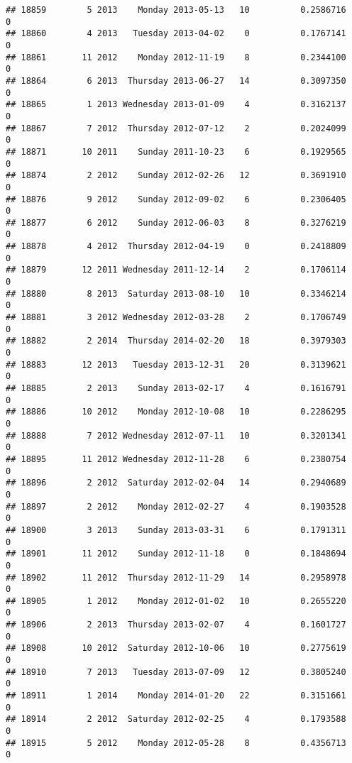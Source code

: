 \documentclass[
]{article}
\begin{document}
\begin{verbatim}
## 18859        5 2013    Monday 2013-05-13   10          0.2586716             0
## 18860        4 2013   Tuesday 2013-04-02    0          0.1767141             0
## 18861       11 2012    Monday 2012-11-19    8          0.2344100             0
## 18864        6 2013  Thursday 2013-06-27   14          0.3097350             0
## 18865        1 2013 Wednesday 2013-01-09    4          0.3162137             0
## 18867        7 2012  Thursday 2012-07-12    2          0.2024099             0
## 18871       10 2011    Sunday 2011-10-23    6          0.1929565             0
## 18874        2 2012    Sunday 2012-02-26   12          0.3691910             0
## 18876        9 2012    Sunday 2012-09-02    6          0.2306405             0
## 18877        6 2012    Sunday 2012-06-03    8          0.3276219             0
## 18878        4 2012  Thursday 2012-04-19    0          0.2418809             0
## 18879       12 2011 Wednesday 2011-12-14    2          0.1706114             0
## 18880        8 2013  Saturday 2013-08-10   10          0.3346214             0
## 18881        3 2012 Wednesday 2012-03-28    2          0.1706749             0
## 18882        2 2014  Thursday 2014-02-20   18          0.3979303             0
## 18883       12 2013   Tuesday 2013-12-31   20          0.3139621             0
## 18885        2 2013    Sunday 2013-02-17    4          0.1616791             0
## 18886       10 2012    Monday 2012-10-08   10          0.2286295             0
## 18888        7 2012 Wednesday 2012-07-11   10          0.3201341             0
## 18895       11 2012 Wednesday 2012-11-28    6          0.2380754             0
## 18896        2 2012  Saturday 2012-02-04   14          0.2940689             0
## 18897        2 2012    Monday 2012-02-27    4          0.1903528             0
## 18900        3 2013    Sunday 2013-03-31    6          0.1791311             0
## 18901       11 2012    Sunday 2012-11-18    0          0.1848694             0
## 18902       11 2012  Thursday 2012-11-29   14          0.2958978             0
## 18905        1 2012    Monday 2012-01-02   10          0.2655220             0
## 18906        2 2013  Thursday 2013-02-07    4          0.1601727             0
## 18908       10 2012  Saturday 2012-10-06   10          0.2775619             0
## 18910        7 2013   Tuesday 2013-07-09   12          0.3805240             0
## 18911        1 2014    Monday 2014-01-20   22          0.3151661             0
## 18914        2 2012  Saturday 2012-02-25    4          0.1793588             0
## 18915        5 2012    Monday 2012-05-28    8          0.4356713             0

\end{verbatim}
\end{document}
